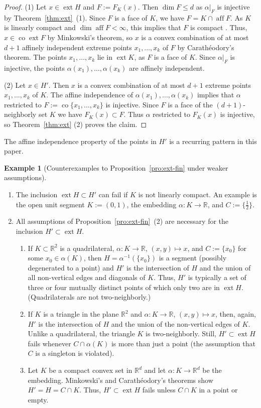\documentclass[a4paper,11pt,reqno]{amsart}
\numberwithin{equation}{section}
\theoremstyle{plain}
\theoremstyle{definition}
\newtheorem{example}[theorem]{Example}
\newcommand{\R}{\mathbb{R}} %
\DeclareMathOperator\aff{aff} %
\DeclareMathOperator\conv{co} %
\DeclareMathOperator{\ext}{ext} %
\begin{document}
%
\begin{proof}
(1) Let $x\in\ext H$ and $F:=F_K(x)$. Then $\dim F\leq d$ as $\alpha|_F$ is injective by 
Theorem~\ref{thm:ext}~(1). Since $F$ is a face of $K$, we have $F=K\cap\aff F$. As $K$ is 
linearly compact and $\dim\aff F<\infty$, this implies that $F$ is compact
\cite[Section~4]{kendall62}. Thus, $x\in\conv\ext F$ by Minkowski's theorem, so $x$ is 
a convex combination of at most $d+1$ affinely independent extreme points $x_1,\dots,x_k$ 
of $F$ by Carath{\'e}odory's theorem. The points $x_1,\dots,x_k$ lie in $\ext K$, as $F$ is 
a face of $K$. Since $\alpha|_F$ is injective, the points $\alpha(x_1),\dots,\alpha(x_k)$ 
are affinely independent.
\par
%
(2) Let $x\in H'$. Then $x$ is a convex combination of at most $d+1$ extreme points 
$x_1,\dots,x_k$ of $K$. The affine independence of $\alpha(x_1),\dots,\alpha(x_k)$ implies 
that $\alpha$ restricted to $F:=\conv\{x_1,\dots,x_k\}$ is injective. Since $F$ is a face 
of the $(d+1)$-neighborly set $K$ we have $F_K(x)\subset F$. Thus $\alpha$ restricted to 
$F_K(x)$ is injective, so Theorem~\ref{thm:ext} (2) proves the claim.
\end{proof}
%
The affine independence property of the points in $H'$ is a recurring pattern
in this paper.
\par
%
\begin{example}[Counterexamples to Proposition~\ref{pro:ext-fin} 
under weaker assumptions]\label{exa:counter}~
\begin{enumerate}
\item 
The inclusion $\ext H\subset H'$ can fail if $K$ is not linearly compact.
An example is the open unit segment $K:=(0,1)$, the embedding 
$\alpha\colon K\to\R$, and $C:=\{\frac{1}{2}\}$.
%
\item 
All assumptions of Proposition~\ref{pro:ext-fin}~(2) are necessary 
for the inclusion $H'\subset\ext H$.
\begin{enumerate}
\item 
If $K\subset\R^2$ is a quadrilateral, $\alpha\colon K\to\R$, $(x,y)\mapsto x$,
and $C:=\{x_0\}$ for some $x_0\in\alpha(K)$, then $H=\alpha^{-1}(\{x_0\})$ is 
a segment (possibly degenerated to a point) and $H'$ is the intersection of 
$H$ and the union of all non-vertical edges and diagonals of $K$. Thus, $H'$ 
is typically a set of three or four mutually distinct points of which only two 
are in $\ext H$. (Quadrilaterals are not two-neighborly.)
\item
If $K$ is a triangle in the plane $\R^2$ and $\alpha\colon K\to\R$, $(x,y)\mapsto x$,
then, again, $H'$ is the intersection of $H$ and the union of the non-vertical edges 
of $K$. Unlike a quadrilateral, the triangle $K$ is two-neighborly. Still, 
$H'\subset\ext H$ fails whenever $C\cap\alpha(K)$ is more than just a point
(the assumption that $C$ is a singleton is violated).
\item 
Let $K$ be a compact convex set in $\R^d$ and let $\alpha\colon K\to\R^d$ be the 
embedding. Minkowski's and Carath\'{e}odory's theorems show $H'=H=C\cap K$. Thus, 
$H'\subset\ext H$ fails unless $C\cap K$ in a point or empty.
\end{enumerate}
\end{enumerate}
\end{example}
\end{document}

